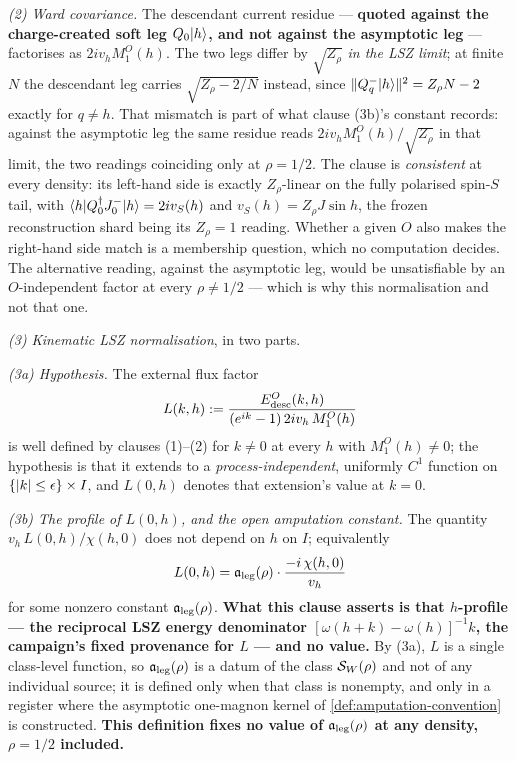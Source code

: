 \begin{definition}
\emph{(2) Ward covariance.} The descendant current residue --- \textbf{quoted
against the charge-created soft leg $Q_0|h\rangle$, and not against the
asymptotic leg} --- factorises as $2iv_hM_1^O(h)$. The two legs differ by
$\sqrt{Z_\rho}$ \emph{in the LSZ limit}; at finite $N$ the descendant leg
carries $\sqrt{Z_\rho-2/N}$ instead, since $\lVert Q^-_q|h\rangle\rVert^2=Z_\rho N-2$
exactly for $q\neq h$. That mismatch is part of what clause (3b)'s constant
records: against the asymptotic leg the same residue reads
$2iv_hM_1^O(h)/\sqrt{Z_\rho}$ in that limit, the two readings coinciding only
at $\rho=1/2$. The clause is \emph{consistent} at every density: its left-hand
side is exactly $Z_\rho$-linear on the fully polarised spin-$S$ tail, with
$\langle h|Q_0^\dagger J^-_0|h\rangle=2iv_S(h)$ and $v_S(h)=Z_\rho J\sin h$, the
frozen reconstruction shard being its $Z_\rho=1$ reading. Whether a given $O$
also makes the right-hand side match is a membership question, which no
computation decides. The alternative reading, against the asymptotic leg,
would be unsatisfiable by an $O$-independent factor at every $\rho\neq1/2$ ---
which is why this normalisation and not that one.

\emph{(3) Kinematic LSZ normalisation}, in two parts.

\emph{(3a) Hypothesis.} The external flux factor
\begin{equation}
  L(k,h):=\frac{E^O_{\rm desc}(k,h)}
                {(e^{ik}-1)\,2iv_h\,M_1^O(h)}
  \label{eq:external-flux-factor}
\end{equation}
is well defined by clauses (1)--(2) for $k\neq0$ at every $h$ with
$M_1^O(h)\neq0$; the hypothesis is that it extends to a
\emph{process-independent}, uniformly $C^1$ function on
$\{\lvert k\rvert\le\epsilon\}\times I$, and $L(0,h)$ denotes that extension's value at
$k=0$.

\emph{(3b) The profile of $L(0,h)$, and the open amputation constant.} The
quantity $v_h\,L(0,h)/\chi(h,0)$ does not depend on $h$ on $I$; equivalently
\begin{equation}
  L(0,h)=\mathfrak{a}_{\mathrm{leg}}(\rho)\cdot\frac{-i\,\chi(h,0)}{v_h}
  \label{eq:L-profile}
\end{equation}
for some nonzero constant $\mathfrak{a}_{\mathrm{leg}}(\rho)$. \textbf{What this clause asserts is
that $h$-profile --- the reciprocal LSZ energy denominator
$[\omega(h+k)-\omega(h)]^{-1}k$, the campaign's fixed provenance for $L$ ---
and no value.} By (3a), $L$ is a single class-level function, so $\mathfrak{a}_{\mathrm{leg}}(\rho)$
is a datum of the class $\mathcal{S}_W(\rho)$ and not of any individual source; it
is defined only when that class is nonempty, and only in a register where the
asymptotic one-magnon kernel of \cref{def:amputation-convention} is
constructed. \textbf{This definition fixes no value of $\mathfrak{a}_{\mathrm{leg}}(\rho)$ at any
density, $\rho=1/2$ included.}


\end{definition}

